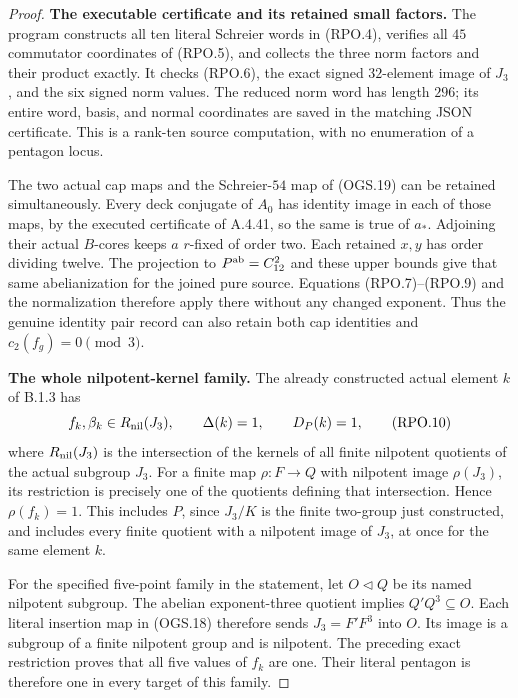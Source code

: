 \begin{proof}
\par\medskip\noindent\textbf{The executable certificate and its retained small factors.}\quad
The program 
constructs all ten literal Schreier words in
(RPO.4), verifies all $45$ commutator coordinates
of (RPO.5), and collects the three norm factors
and their product exactly.
It checks (RPO.6), the exact signed $32$-element
image of $J_3$, and the six signed norm values.
The reduced norm word has length $296$; its
entire word, basis, and normal coordinates are
saved in the matching JSON certificate.
This is a rank-ten source computation, with no
enumeration of a pentagon locus.

The two actual cap maps and the Schreier-$54$
map of (OGS.19) can be retained simultaneously.
Every deck conjugate of $A_0$ has identity
image in each of those maps, by the executed
certificate of A.4.41, so the same is true of
$a_*$.
Adjoining their actual $B$-cores keeps $a$
$r$-fixed of order two.  Each retained $x,y$
has order dividing twelve.  The projection to
$P^{\rm ab}=C_{12}^2$ and these upper bounds
give that same abelianization for the joined
pure source.  Equations (RPO.7)--(RPO.9) and
the normalization therefore apply there without
any changed exponent.
Thus the genuine identity pair record can also
retain both cap identities and $c_2(f_g)=0\pmod3$.

\par\medskip\noindent\textbf{The whole nilpotent-kernel family.}\quad
The already constructed actual element $k$ of
B.1.3 has
\[
 f_k,\beta_k\in R_{\rm nil}(J_3),\qquad
 \Delta(k)=1,\qquad D_P(k)=1,
                                                               \tag{RPO.10}
\]
where $R_{\rm nil}(J_3)$ is the intersection of
the kernels of all finite nilpotent quotients of
the actual subgroup $J_3$.
For a finite map $\rho:F\to Q$ with nilpotent
image $\rho(J_3)$, its restriction is precisely
one of the quotients defining that intersection.
Hence $\rho(f_k)=1$.
This includes $P$, since $J_3/K$ is the finite
two-group just constructed, and includes every
finite quotient with a nilpotent image of $J_3$,
at once for the same element $k$.

For the specified five-point family in the
statement, let $O\triangleleft Q$ be its named
nilpotent subgroup.  The abelian exponent-three
quotient implies $Q'Q^3\subseteq O$.
Each literal insertion map in (OGS.18) therefore
sends $J_3=F'F^3$ into $O$.
Its image is a subgroup of a finite nilpotent
group and is nilpotent.  The preceding exact
restriction proves that all five values of
$f_k$ are one.  Their literal pentagon is
therefore one in every target of this family.
\end{proof}

